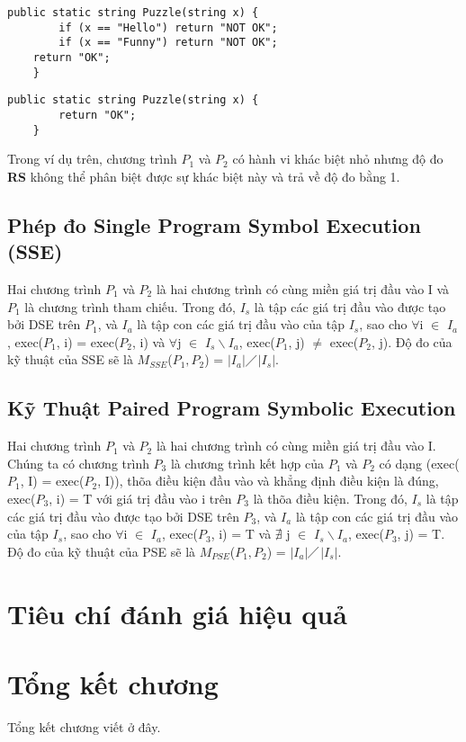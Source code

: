 \begin{lstlisting}[caption={Chương trình $P_{1}$}, label={Script}]
	public static string Puzzle(string x) {
		if (x == "Hello") return "NOT OK";
		if (x == "Funny") return "NOT OK";
	return "OK";
	}
\end{lstlisting}

	
\begin{lstlisting}[caption={Chương trình $P_{2}$}, label={Script}]
	public static string Puzzle(string x) {
		return "OK";
	}
\end{lstlisting}
	
Trong ví dụ trên, chương trình $P_{1}$ và $P_{2}$ có hành vi khác biệt
nhỏ nhưng độ đo \textbf{RS} không thể phân biệt được sự khác biệt này
và trả về độ đo bằng 1.
	
\subsection{Phép đo Single Program Symbol Execution (SSE)}


\begin{definition}
  Hai chương trình $P_{1}$ và $P_{2}$ là hai chương trình có cùng miền
  giá trị đầu vào I và $P_{1}$ là chương trình tham chiếu. Trong đó,
  $I_{s}$ là tập các giá trị đầu vào được tạo bởi DSE trên $P_{1}$, và
  $I_{a}$ là tập con các giá trị đầu vào của tập $I_{s}$, sao cho
  $\forall$i $\in$ $I_{a}$, exec($P_{1}$, i) = exec($P_{2}$, i) và
  $\forall$j $\in$ $I_{s} \backslash I_{a}$, exec($P_{1}$, j) $\neq$
  exec($P_{2}$, j). Độ đo của kỹ thuật của SSE sẽ là
  $M_{SSE}$($P_{1},P_{2}$) =
  $\left|I_{a}\right|$$\diagup$$\left|I_{s}\right|$.
\end{definition}

\subsection{Kỹ Thuật Paired Program Symbolic Execution}

	
\begin{definition}
  Hai chương trình $P_{1}$ và $P_{2}$ là hai chương trình có cùng miền
  giá trị đầu vào I. Chúng ta có chương trình $P_{3}$ là chương trình
  kết hợp của $P_{1}$ và $P_{2}$ có dạng (exec($P_{1}$, I) =
  exec($P_{2}$, I)), thõa điều kiện đầu vào và khẳng định điều kiện là
  đúng, exec($P_{3}$, i) = T với giá trị đầu vào i trên $P_{3}$ là
  thõa điều kiện. Trong đó, $I_{s}$ là tập các giá trị đầu vào được
  tạo bởi DSE trên $P_{3}$, và $I_{a}$ là tập con các giá trị đầu vào
  của tập $I_{s}$, sao cho $\forall$i $\in$ $I_{a}$, exec($P_{3}$, i)
  = T và $\nexists $ j $\in$ $I_{s} \backslash I_{a}$, exec($P_{3}$,
  j) = T. Độ đo của kỹ thuật của PSE sẽ là $M_{PSE}$($P_{1},P_{2}$) =
  $\left|I_{a}\right|$$\diagup$$\left|I_{s}\right|$.
\end{definition}

\section{Tiêu chí đánh giá hiệu quả}


\section*{Tổng kết chương}

Tổng kết chương viết ở đây.



